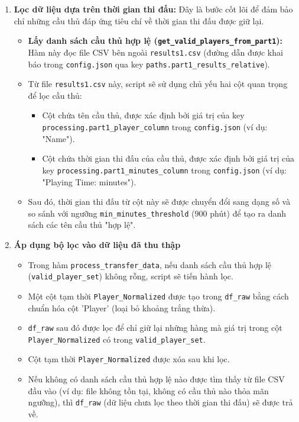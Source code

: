 \documentclass[12pt, a4paper]{report}
\begin{document}
\begin{enumerate}[label=\textbf{Bước \arabic*:}, leftmargin=* , itemsep=1ex]
    \item \textbf{Lọc dữ liệu dựa trên thời gian thi đấu:} 
    Đây là bước cốt lõi để đảm bảo chỉ những cầu thủ đáp ứng tiêu chí về thời gian thi đấu được giữ lại.
    \begin{itemize}[leftmargin=0em]
        \item \textbf{Lấy danh sách cầu thủ hợp lệ (\texttt{get\_valid\_players\_from\_part1}):} Hàm này đọc file CSV bên ngoài \texttt{results1.csv} (đường dẫn được khai báo trong \texttt{config.json} qua key \texttt{paths.part1\_results\_relative}).
        \item Từ file \texttt{results1.csv} này, script sẽ sử dụng chủ yếu hai cột quan trọng để lọc cầu thủ:
        \begin{itemize}
            \item Cột chứa tên cầu thủ, được xác định bởi giá trị của key \texttt{processing.part1\_player\_column} trong \texttt{config.json} (ví dụ: "Name").
            \item Cột chứa thời gian thi đấu của cầu thủ, được xác định bởi giá trị của key \texttt{processing.part1\_minutes\_column} trong \texttt{config.json} (ví dụ: "Playing Time: minutes").
        \end{itemize}
        \item Sau đó, thời gian thi đấu từ cột này sẽ được chuyển đổi sang dạng số và so sánh với ngưỡng \texttt{min\_minutes\_threshold} (900 phút) để tạo ra danh sách các tên cầu thủ "hợp lệ".
    \end{itemize}

    \item \textbf{Áp dụng bộ lọc vào dữ liệu đã thu thập}
    \begin{itemize}
        \item Trong hàm \texttt{process\_transfer\_data}, nếu danh sách cầu thủ hợp lệ (\texttt{valid\_player\_set}) không rỗng, script sẽ tiến hành lọc.
        \item Một cột tạm thời \texttt{Player\_Normalized} được tạo trong \texttt{df\_raw} bằng cách chuẩn hóa cột 'Player' (loại bỏ khoảng trắng thừa).
        \item \texttt{df\_raw} sau đó được lọc để chỉ giữ lại những hàng mà giá trị trong cột \texttt{Player\_Normalized} có trong \texttt{valid\_player\_set}.
        \item Cột tạm thời \texttt{Player\_Normalized} được xóa sau khi lọc.
        \item Nếu không có danh sách cầu thủ hợp lệ nào được tìm thấy từ file CSV đầu vào (ví dụ: file không tồn tại, không có cầu thủ nào thỏa mãn ngưỡng), thì \texttt{df\_raw} (dữ liệu chưa lọc theo thời gian thi đấu) sẽ được trả về.
    \end{itemize}
\end{enumerate}
\end{document}
